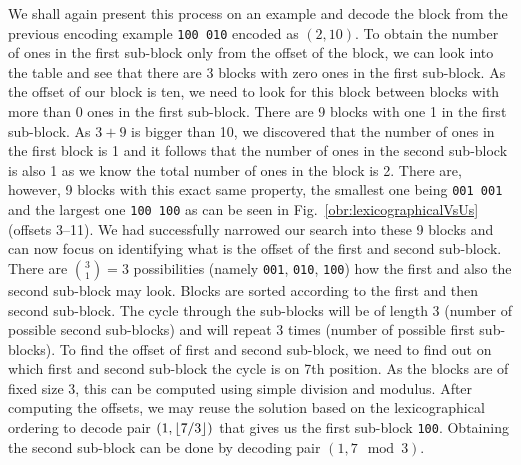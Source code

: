 We shall again present this process on an example and decode the block from the previous
encoding example {\tt 100 010} encoded as $(2, 10)$. To obtain the number of ones in
the first sub-block only from the offset of the block, we can look into the table and
see that there are 3 blocks with zero ones in the first sub-block. As the offset of our
block is ten, we need to look for this block between blocks with more than 0 ones in the
first sub-block. There are 9 blocks with one 1 in the first sub-block. As $3+9$ is bigger
than 10, we discovered that the number of ones in the first block is 1 and it follows that
the number of ones in the second sub-block is also 1 as we know the total number of ones in
the block is 2. There are, however, 9 blocks with this exact same property, the smallest one
being {\tt 001 001} and the largest one {\tt 100 100} as can be seen in
Fig.~\ref{obr:lexicographicalVsUs} (offsets 3--11). We had successfully narrowed our search
into these 9 blocks and can now focus on identifying what is the offset of the first and second
sub-block. There are ${3 \choose 1} = 3$ possibilities (namely {\tt 001}, {\tt 010}, {\tt 100})
how the first and also the second sub-block may look. Blocks are sorted according to the first
and then second sub-block. The cycle through the sub-blocks will be of length 3 (number of
possible second sub-blocks) and will repeat 3 times (number of possible first sub-blocks). To
find the offset of first and second sub-block, we need to find out on which first and second
sub-block the cycle is on 7th position. As the blocks are of fixed size 3, this can be
computed using simple division and modulus. After computing the offsets, we may reuse the
solution based on the lexicographical ordering to decode pair $(1, \left\lfloor 7/3 \right\rfloor)$ that gives us
the first sub-block {\tt 100}. Obtaining the second sub-block can be done by decoding pair
$(1, 7\mod 3)$.

